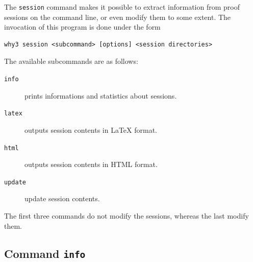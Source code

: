 The \texttt{session} command makes it possible to extract information from
proof sessions on the command line, or even modify them to some
extent. The invocation of this program is done under the form
\begin{verbatim}
why3 session <subcommand> [options] <session directories>
\end{verbatim}
The available subcommands are as follows:
\begin{description}
\item[\texttt{info}] prints informations and statistics about sessions.
\item[\texttt{latex}] outputs session contents in LaTeX format.
\item[\texttt{html}] outputs session contents in HTML format.
\item[\texttt{update}] update session contents.
\end{description}

The first three commands do not modify the sessions, whereas the last
modify them.

\subsection{Command \texttt{info}}

